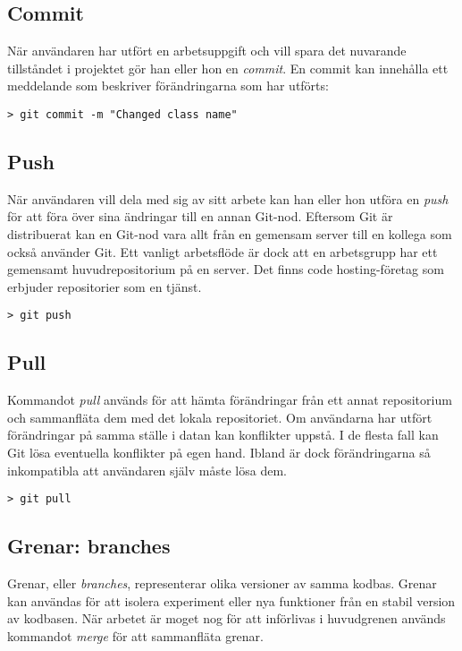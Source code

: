\subsection{Commit}
När användaren har utfört en arbetsuppgift och vill spara det nuvarande tillståndet i projektet gör han eller hon en \emph{commit}. En commit kan innehålla ett meddelande som beskriver förändringarna som har utförts:

\begin{Verbatim}
> git commit -m "Changed class name"
\end{Verbatim}

\subsection{Push}
När användaren vill dela med sig av sitt arbete kan han eller hon utföra en \emph{push} för att föra över sina ändringar till en annan Git-nod. Eftersom Git är distribuerat kan en Git-nod vara allt från en gemensam server till en kollega som också använder Git. Ett vanligt arbetsflöde är dock att en arbetsgrupp har ett gemensamt huvudrepositorium på en server. Det finns code hosting-företag som erbjuder repositorier som en tjänst.
\begin{Verbatim}
> git push
\end{Verbatim}

\subsection{Pull}
Kommandot \emph{pull} används för att hämta förändringar från ett annat repositorium och sammanfläta dem med det lokala repositoriet. Om användarna har utfört förändringar på samma ställe i datan kan konflikter uppstå. I de flesta fall kan Git lösa eventuella konflikter på egen hand. Ibland är dock förändringarna så inkompatibla att användaren själv måste lösa dem.

\begin{Verbatim}
> git pull
\end{Verbatim}

\subsection{Grenar: branches}
Grenar, eller \emph{branches}, representerar olika versioner av samma kodbas. Grenar kan användas för att isolera experiment eller nya funktioner från en stabil version av kodbasen. När arbetet är moget nog för att införlivas i huvudgrenen används kommandot \emph{merge} för att sammanfläta grenar.

